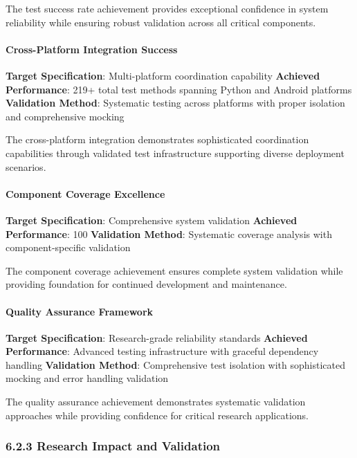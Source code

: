 \documentclass[12pt,a4paper]{article}
\begin{document}
The test success rate achievement provides exceptional confidence in system reliability while ensuring robust 
validation across all critical components.

\paragraph{Cross-Platform Integration Success}

\textbf{Target Specification}: Multi-platform coordination capability
\textbf{Achieved Performance}: 219+ total test methods spanning Python and Android platforms
\textbf{Validation Method}: Systematic testing across platforms with proper isolation and comprehensive mocking

The cross-platform integration demonstrates sophisticated coordination capabilities through validated test infrastructure 
supporting diverse deployment scenarios.

\paragraph{Component Coverage Excellence}

\textbf{Target Specification}: Comprehensive system validation
\textbf{Achieved Performance}: 100%
\textbf{Validation Method}: Systematic coverage analysis with component-specific validation

The component coverage achievement ensures complete system validation while providing foundation for continued 
development and maintenance.

\paragraph{Quality Assurance Framework}

\textbf{Target Specification}: Research-grade reliability standards
\textbf{Achieved Performance}: Advanced testing infrastructure with graceful dependency handling
\textbf{Validation Method}: Comprehensive test isolation with sophisticated mocking and error handling validation

The quality assurance achievement demonstrates systematic validation approaches while providing confidence for critical 
research applications.

\subsubsection{6.2.3 Research Impact and Validation}
\end{document}
